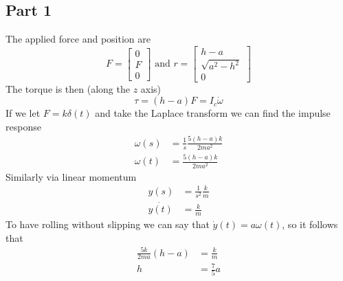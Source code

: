\subsection{Part 1}
The applied force and position are
\begin{equation}
    F = \begin{bmatrix}
        0\\
        F\\
        0
    \end{bmatrix} \textrm{ and } r = \begin{bmatrix}
        h-a\\
        \sqrt{a^2-h^2}\\
        0
    \end{bmatrix}
\end{equation}
The torque is then  (along the $z$ axis)
\begin{equation}
    \tau = (h-a)F = I_c \dot{\omega}
\end{equation}
If we let $F = k\delta(t)$ and take the Laplace transform we can find the impulse response
\begin{equation}
\begin{split}
    \omega(s) &= \frac{1}{s}\frac{5(h-a)k}{2ma^2}\\
    \omega(t) &= \frac{5(h-a)k}{2ma^2}
\end{split}
\end{equation}
Similarly via linear momentum
\begin{equation}
    \begin{split}
        y(s) &= \frac{1}{s^2}\frac{k}{m}\\
        \dot{y(t)} &= \frac{k}{m}
    \end{split}
\end{equation}
To have rolling without slipping we can say that $\dot{y}(t) = a \omega (t)$, so it follows that
\begin{equation}
    \begin{split}
        \frac{5k}{2ma}(h-a) &= \frac{k}{m}\\
        h &= \frac{7}{5}a
    \end{split}
\end{equation}

